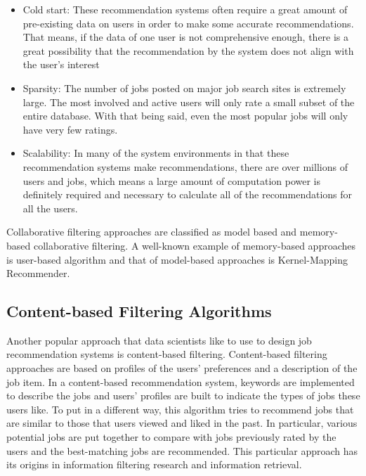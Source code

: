 \documentclass[sigconf]{acmart}
\begin{document}
\begin{itemize}
  \item Cold start: These recommendation systems often require a great amount of pre-existing data on users in order to make some accurate recommendations.\cite{CF2017} That means, if the data of one user is not comprehensive enough, there is a great possibility that the recommendation by the system does not align with the user's interest
  \item Sparsity: The number of jobs posted on major job search sites is extremely large. The most involved and active users will only rate a small subset of the entire database. With that being said, even the most popular jobs will only have very few ratings.
  \item Scalability: In many of the system environments in that these recommendation systems make recommendations, there are over millions of users and jobs, which means a large amount of computation power is definitely required and necessary to calculate all of the recommendations for all the users.

\end{itemize}

\par Collaborative filtering approaches are classified as model based and memory-based collaborative filtering.\cite{Standford} A well-known example of memory-based approaches is user-based algorithm and that of model-based approaches is Kernel-Mapping Recommender.


\subsection{Content-based Filtering Algorithms}
Another popular approach that data scientists like to use to design job recommendation systems is content-based filtering. Content-based filtering approaches are based on profiles of the users’ preferences and a description of the job item.\cite{Zhou2017} In a content-based recommendation system, keywords are implemented to describe the jobs and users' profiles are built to indicate the types of jobs these users like.\cite{CBF2017} To put in a different way, this algorithm tries to recommend jobs that are similar to those that users viewed and liked in the past. In particular, various potential jobs are put together to compare with jobs previously rated by the users and the best-matching jobs are recommended. This particular approach has its origins in information filtering research and information retrieval.
\end{document}
